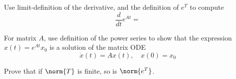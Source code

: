 \begin{fullwidth}
\begin{highlight}
\begin{example}
  Use limit-definition of the derivative, and the definition of \(e^{T}\) to compute
  \[
    \frac{d}{dt}e^{At} =
  \]
\end{example}

\begin{example}
  For matrix \(A\), use definition of the power series to show that the expression \(x(t) = e^{At}x_{0}\) is a solution of the matrix ODE
  \[
    \dot x(t) = A x(t), \quad x(0) = x_{0}
  \]
\end{example}

\begin{example}
  Prove that if \(\norm{T}\) is finite,
  so is \(\norm{e^{T}}\).
\end{example}

\end{highlight}
\end{fullwidth}

